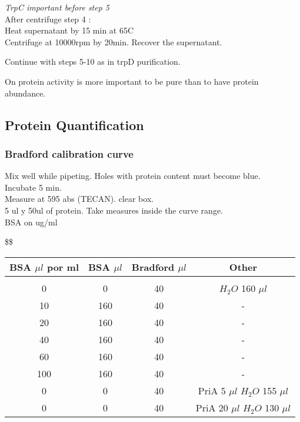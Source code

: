 \documentclass[]{article}
\begin{document}
\emph{TrpC important before step 5}\\
After centrifuge step 4 :\\
Heat supernatant by 15 min at 65C\\
Centrifuge at 10000rpm by 20min. Recover the supernatant.

Continue with steps 5-10 as in trpD purification.

On protein activity is more important to be pure than to have protein
abundance.

\subsection{Protein Quantification}\label{protein-quantification}

\subsubsection{Bradford calibration
curve}\label{bradford-calibration-curve}

Mix well while pipeting. Holes with protein content must become blue.\\
Incubate 5 min.\\
Measure at 595 abs (TECAN). clear box.\\
5 ul y 50ul of protein. Take measures inside the curve range.\\
BSA on ug/ml

\$\$ \label{ScoD11_A}

\begin{tabular}{c c c c}
\hline 
BSA $\mu l$ por ml & BSA $\mu l$ & Bradford $\mu l$ & Other \\ [1ex]
\hline \\ [-1.5ex]  
0                & 0      & 40 & $H_2O$ 160 $\mu l$   \\ [1 ex]
10               & 160    & 40 &    -                 \\ [1 ex]
20               & 160    & 40 & -                    \\ [1 ex]
40               & 160    & 40 & -                    \\ [1 ex]
60               & 160    & 40 &-                     \\ [1 ex]
100              & 160    & 40 & -                    \\ [1 ex]
0                &   0    & 40 &  PriA 5 $\mu l$   $H_2O$ 155 $\mu l$   \\ [1 ex]
0                &   0    & 40 &  PriA 20 $\mu l$   $H_2O$ 130 $\mu l$  \\ [1 ex]

\hline  
\end {tabular}
\end{document}
